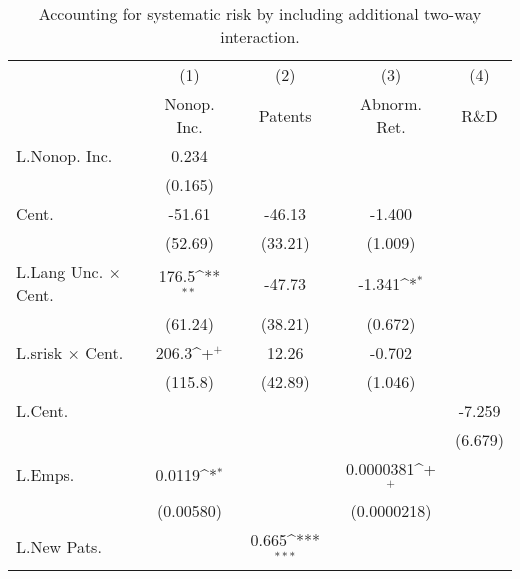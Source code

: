\begin{table}
\begin{center}
\caption[Accounting for systematic Risk]{Accounting for systematic risk by including additional two-way interaction.\label{sys}}
\vspace{0.3in}
{
\def\sym#1{\ifmmode^{#1}\else\(^{#1}\)\fi}
\begin{tabular}{l*{4}{c}}
\hline\hline
                    &\multicolumn{1}{c}{(1)}&\multicolumn{1}{c}{(2)}&\multicolumn{1}{c}{(3)}&\multicolumn{1}{c}{(4)}\\
                    &\multicolumn{1}{c}{Nonop. Inc.}&\multicolumn{1}{c}{Patents}&\multicolumn{1}{c}{Abnorm. Ret.}&\multicolumn{1}{c}{R\&D}\\
\hline
L.Nonop. Inc.       &       0.234         &                     &                     &                     \\
                    &     (0.165)         &                     &                     &                     \\
Cent.               &      -51.61         &      -46.13         &      -1.400         &                     \\
                    &     (52.69)         &     (33.21)         &     (1.009)         &                     \\
L.Lang Unc. $\times$ Cent.&       176.5\sym{**} &      -47.73         &      -1.341\sym{*}  &                     \\
                    &     (61.24)         &     (38.21)         &     (0.672)         &                     \\
L.srisk $\times$ Cent.&       206.3\sym{+}  &       12.26         &      -0.702         &                     \\
                    &     (115.8)         &     (42.89)         &     (1.046)         &                     \\
L.Cent.             &                     &                     &                     &      -7.259         \\
                    &                     &                     &                     &     (6.679)         \\
L.Emps.             &      0.0119\sym{*}  &                     &   0.0000381\sym{+}  &                     \\
                    &   (0.00580)         &                     & (0.0000218)         &                     \\
L.New Pats.         &                     &       0.665\sym{***}&                     &                     \\

\end{tabular}}
\end{center}
\end{table}
